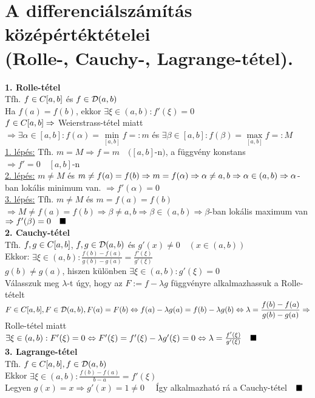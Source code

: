 \documentclass[a4paper,11pt]{article}
\begin{document}
\section{A differenciálszámítás középértéktételei \\ (Rolle-, Cauchy-, Lagrange-tétel).}
\textbf{1. Rolle-tétel}\\[0.1cm]\tetel Tfh. $f\in C[a,b]$ és $f\in\displaystyle\mathcal{D}(a,b)$\\[0.2cm]Ha
$f(a)=f(b)$, ekkor $\exists\xi\in(a,b):f'(\xi)=0$\\[0.2cm]\biz $f\in C[a,b]\Rightarrow$
Weierstrass-tétel miatt\\[0.2cm]$\Rightarrow\exists\alpha\in[a,b]:f(\alpha)=
\min\limits_{[a,b]}f=:m$ és $\exists\beta\in[a,b]:f(\beta)= \max\limits_{[a,b]}f=:M$
\\[0.2cm]\underline{1. lépés:} Tfh. $m=M\Rightarrow f=m\quad([a,b]$-n$)$, a függvény
konstans $\Rightarrow f'=0\quad[a,b]$-n\\[0.2cm]\underline{2. lépés:} $m\neq M$ és
$m\neq f(a)=f(b)\Rightarrow m=f(\alpha)\Rightarrow\alpha\neq a,b
\Rightarrow\alpha\in(a,b)\\[0.2cm]\Rightarrow\alpha$-ban lokális minimum van.
$\Rightarrow f'(\alpha)=0$\\[0.2cm]\underline{3. lépés:} Tfh. $m\neq M$ és $m=f(a)
=f(b)$\\[0.2cm]$\Rightarrow M\neq f(a)=f(b)\Rightarrow\beta\neq a,b\Rightarrow\beta
\in(a,b)\Rightarrow\beta$-ban lokális maximum van $\Rightarrow f'(\beta)=0\quad\blacksquare$
\\[0.2cm]\textbf{2. Cauchy-tétel}\\[0.1cm]\tetel Tfh. $f,g\in C[a,b]$, $f,g\in\displaystyle\mathcal{D}(a,b)$ és
$g'(x)\neq0\quad(x\in(a,b))$\\[0.2cm]Ekkor: $\exists\xi\in(a,b):
\frac{f(b)-f(a)}{g(b)-g(a)}=\frac{f'(\xi)}{g'(\xi)}$\\[0.2cm]\biz
$g(b)\neq g(a)$, hiszen különben $\exists\xi\in(a,b):g'(\xi)=0$\\[0.2cm]Válasszuk meg
$\lambda$-t úgy, hogy az $F:=f-\lambda g$ függvényre alkalmazhassuk a
Rolle-tételt\\[0.2cm]$F\in C[a,b],F\in\displaystyle\mathcal{D}(a,b), F(a)=F(b)\Leftrightarrow f(a)-\lambda g(a)=
f(b)-\lambda g(b)\Leftrightarrow\lambda=\frac{f(b)-f(a)}{g(b)-g(a)}\\[0.2cm]
\Rightarrow$ Rolle-tétel miatt $\exists\xi\in(a,b):F'(\xi)=0\Leftrightarrow F'(\xi)
=f'(\xi)-\lambda g'(\xi)=0\Leftrightarrow\lambda=\frac{f'(\xi)}{g'(\xi)}\quad\blacksquare$
\\[0.2cm]\textbf{3. Lagrange-tétel}\\[0.1cm]\tetel Tfh. $f\in C[a,b],f\in\displaystyle\mathcal{D}(a,b)$\\[0.2cm]Ekkor
$\exists\xi\in(a,b):\frac{f(b)-f(a)}{b-a}=f'(\xi)$\\[0.2cm]\biz Legyen $g(x)=x
\Rightarrow g'(x)=1\neq0\quad$ Így alkalmazható rá a Cauchy-tétel$\quad\blacksquare$
\newpage
\end{document}
